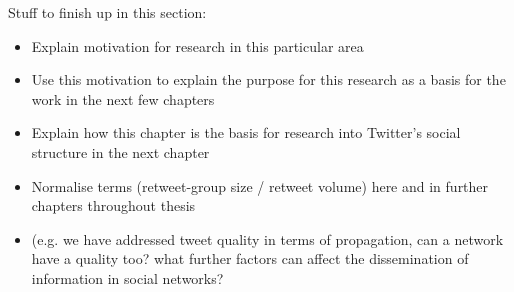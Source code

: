 Stuff to finish up in this section:
\begin{itemize}
\item Explain motivation for research in this particular area
\item Use this motivation to explain the purpose for this research as a basis for the work in the next few chapters
\item Explain how this chapter is the basis for research into Twitter's social structure in the next chapter
\item Normalise terms (retweet-group size / retweet volume) here and in further chapters throughout thesis
\item (e.g. we have addressed tweet quality in terms of propagation, can a network have a quality too? what further factors can affect the dissemination of information in social networks?
\end{itemize}

